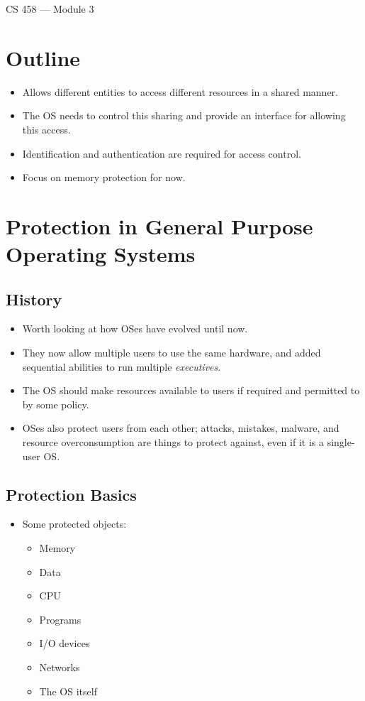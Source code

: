 \documentclass{article}
\author{Clement Tsang}
\begin{document}
\begin{center}
    \Large{CS 458 --- Module 3}
\end{center}

\section{Outline}
\begin{itemize}
    \item Allows different entities to access different resources in a shared manner.
    \item The OS needs to control this sharing and provide an interface for allowing this access.
    \item Identification and authentication are required for access control.
    \item Focus on memory protection for now.
\end{itemize}

\section{Protection in General Purpose Operating Systems}
\subsection{History}
\begin{itemize}
    \item Worth looking at how OSes have evolved until now.
    \item They now allow multiple users to use the same hardware, and added sequential abilities to run multiple \emph{executives}.  
    \item The OS should make resources available to users if required and permitted to by some policy.
    \item OSes also protect users from each other; attacks, mistakes, malware, and resource overconsumption are things to protect against, even if it is a single-user OS.
\end{itemize}
\subsection{Protection Basics}
\begin{itemize}
    \item Some protected objects:
        \begin{itemize}
            \item Memory
            \item Data
            \item CPU
            \item Programs
            \item I/O devices
            \item Networks
            \item The OS itself
        \end{itemize}
\end{itemize}
\end{document}
